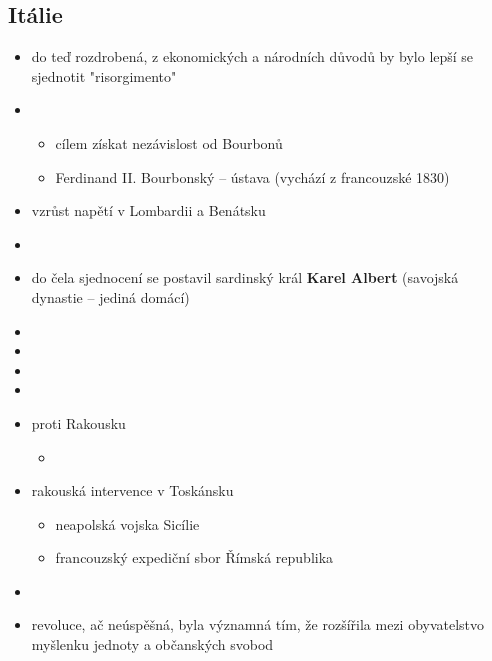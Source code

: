 \subsection{Itálie}
\begin{itemize}
\item do teď rozdrobená, z ekonomických a národních důvodů by bylo lepší se sjednotit \ra "risorgimento"
\item {}
	\begin{itemize}
	\item cílem získat nezávislost od Bourbonů
	\item Ferdinand II. Bourbonský -- ústava (vychází z francouzské 1830)
	\end{itemize}
\item[\ra] vzrůst napětí v Lombardii a Benátsku
\item {}
\item do čela sjednocení se postavil sardinský král \textbf{Karel Albert} (savojská dynastie -- jediná domácí)
\item {}
\item {}
\item {}
\item {}
\item {} proti Rakousku
	\begin{itemize}
	\item {} \ra 
	\end{itemize}
\item rakouská intervence v Toskánsku
	\begin{itemize}
	\item neapolská vojska \ra Sicílie
	\item francouzský expediční sbor \ra Římská republika
	\end{itemize}
\item {}
\item revoluce, ač neúspěšná, byla významná tím, že rozšířila mezi obyvatelstvo myšlenku jednoty a občanských svobod
\end{itemize}


